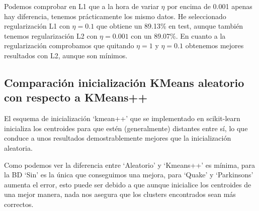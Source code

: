 Podemos comprobar en L1 que a la hora de variar $\eta$ por encima de 0.001 apenas hay diferencia, tenemos prácticamente los mismo datos. He seleccionado regularización L1 con $\eta = 0.1$ que obtiene un 89.13\% en test, aunque también tenemos regularización L2 con $\eta = 0.001$ con un 89.07\%. En cuanto a la regularización comprobamos que quitando $\eta = 1$ y $\eta = 0.1$ obtenemos mejores resultados con L2, aunque son mínimos.

\subsection{Comparación inicialización KMeans aleatorio con respecto a KMeans++}

El esquema de inicialización `kmean++' que se implementado en scikit-learn inicializa los centroides para que estén (generalmente) distantes entre sí, lo que conduce a unos resultados demostrablemente mejores que la inicialización aleatoria.

\begin{table}[H]
\centering
\vspace{1ex}
\small
{}
\caption{Comparación entre iniciación aleatoria y kmeans++ en BD regresión}
\label{table:tablacomparacionkmeans++}
\end{table}

Como podemos ver la diferencia entre `Aleatorio' y `Kmeans++' es mínima, para la BD `Sin' es la única que conseguimos una mejora, para `Quake' y `Parkinsons' aumenta el error, esto puede ser debido a que aunque inicialice los centroides de una mejor manera, nada nos asegura que los clusters encontrados sean más correctos.

